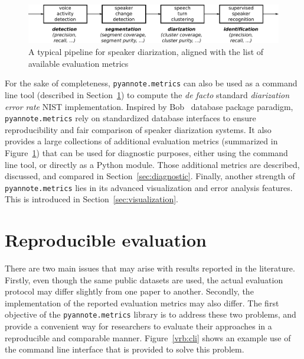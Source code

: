 \documentclass[a4paper]{article}
\newcommand*\metrics{\texttt{\footnotesize{pyannote.metrics}}}
\begin{document}
\begin{figure}[htb]
  \centering
  \includegraphics[width=0.8\linewidth]{figures/pipeline.pdf}
  \caption{A typical pipeline for speaker diarization, aligned with the list of available evaluation metrics }
  \label{fig:pipeline}
\end{figure}

For the sake of completeness, \metrics{} can also be used as a command line tool (described in Section~\ref{sec:reproducible_evaluation}) to compute the \emph{de facto} standard \emph{diarization error rate} NIST implementation.
Inspired by Bob~\cite{Bob2012} database package paradigm, \metrics{} rely on standardized database interfaces to ensure reproducibility and fair comparison of speaker diarization systems.
It also provides a large collections of additional evaluation metrics (summarized in Figure~\ref{fig:pipeline}) that can be used for diagnostic purposes, either using the command line tool, or directly as a Python module.
Those additional metrics are described, discussed, and compared in Section~\ref{sec:diagnostic}.
Finally, another strength of \metrics{} lies in its advanced visualization and error analysis features.
This is introduced in Section~\ref{sec:visualization}.

\section{Reproducible evaluation}
\label{sec:reproducible_evaluation}

There are two main issues that may arise with results reported in the literature.
Firstly, even though the same public datasets are used, the actual evaluation protocol may differ slightly from one paper to another.
Secondly, the implementation of the reported evaluation metrics may also differ.
The first objective of the \metrics{} library is to address these two problems, and provide a convenient way for researchers to evaluate their approaches in a reproducible and comparable manner.
Figure~\ref{vrb:cli} shows an example use of the command line interface that is provided to solve this problem.
\end{document}
